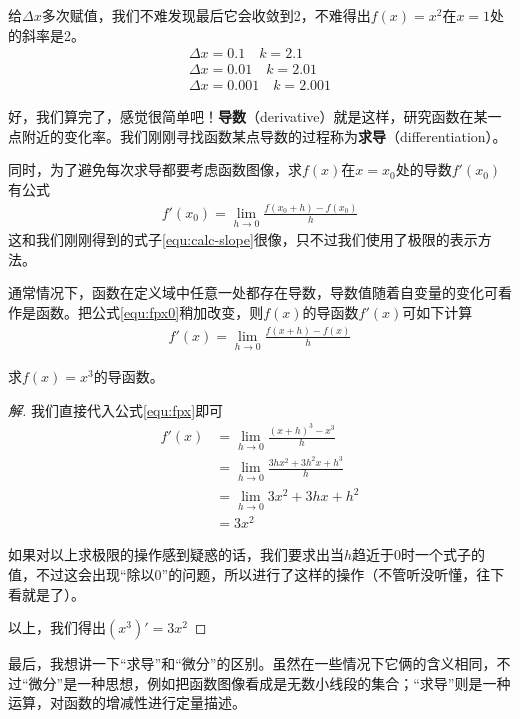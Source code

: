 给$\Delta x$多次赋值，我们不难发现最后它会收敛到2，不难得出$f(x)=x^2$在$x=1$处的斜率是2。
\begin{gather*}
    \Delta x=0.1 \quad k=2.1 \\
    \Delta x=0.01 \quad k=2.01 \\
    \Delta x=0.001 \quad k=2.001
\end{gather*}

好，我们算完了，感觉很简单吧！\textbf{导数}（derivative）就是这样，研究函数在某一点附近的变化率。我们刚刚寻找函数某点导数的过程称为\textbf{求导}（differentiation）。

同时，为了避免每次求导都要考虑函数图像，求$f(x)$在$x=x_0$处的导数$f'(x_0)$有公式
\begin{gather}
    f'(x_0)=\lim_{h\to0}\frac{f(x_0+h)-f(x_0)}{h} \label{equ:fpx0}
\end{gather}
这和我们刚刚得到的式子\eqref{equ:calc-slope}很像，只不过我们使用了极限的表示方法。

通常情况下，函数在定义域中任意一处都存在导数，导数值随着自变量的变化可看作是函数。把公式\eqref{equ:fpx0}稍加改变，则$f(x)$的导函数$f'(x)$可如下计算
\begin{gather}
    f'(x)=\lim_{h\to0}\frac{f(x+h)-f(x)}{h} \label{equ:fpx}
\end{gather}

\begin{example}
    求$f(x)=x^3$的导函数。
\end{example}

\begin{proof}[解]
    我们直接代入公式\eqref{equ:fpx}即可
    \begin{align*}
        f'(x)&=\lim_{h\to0}\frac{(x+h)^3-x^3}{h} \\
             &=\lim_{h\to0}\frac{3hx^2+3h^2x+h^3}{h} \\
             &=\lim_{h\to0}3x^2+3hx+h^2 \\
             &=3x^2
    \end{align*}

    如果对以上求极限的操作感到疑惑的话，我们要求出当$h$趋近于0时一个式子的值，不过这会出现“除以0”的问题，所以进行了这样的操作（不管听没听懂，往下看就是了）。

    以上，我们得出$(x^3)'=3x^2$\qedhere
\end{proof}

最后，我想讲一下“求导”和“微分”的区别。虽然在一些情况下它俩的含义相同，不过“微分”是一种思想，例如把函数图像看成是无数小线段的集合；“求导”则是一种运算，对函数的增减性进行定量描述。

